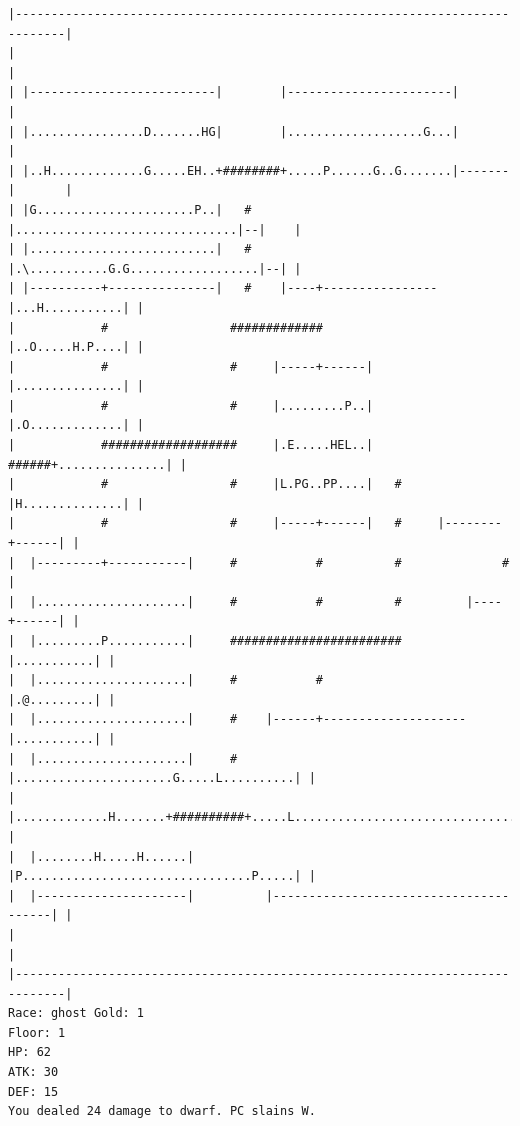 \documentclass[11pt]{article}
\theoremstyle{plain}
\begin{document}
\begin{Verbatim}[fontsize=\scriptsize]
|-----------------------------------------------------------------------------|
|                                                                             |
| |--------------------------|        |-----------------------|               |
| |................D.......HG|        |...................G...|               |
| |..H.............G.....EH..+########+.....P......G..G.......|-------|       |
| |G......................P..|   #    |...............................|--|    |
| |..........................|   #    |.\...........G.G..................|--| |
| |----------+---------------|   #    |----+----------------|...H...........| |
|            #                 #############                |..O.....H.P....| |
|            #                 #     |-----+------|         |...............| |
|            #                 #     |.........P..|         |.O.............| |
|            ###################     |.E.....HEL..|   ######+...............| |
|            #                 #     |L.PG..PP....|   #     |H..............| |
|            #                 #     |-----+------|   #     |--------+------| |
|  |---------+-----------|     #           #          #              #        |
|  |.....................|     #           #          #         |----+------| |
|  |.........P...........|     ########################         |...........| |
|  |.....................|     #           #                    |.@.........| |
|  |.....................|     #    |------+--------------------|...........| |
|  |.....................|     #    |......................G.....L..........| |
|  |.............H.......+##########+.....L.................................| |
|  |........H.....H......|          |P................................P.....| |
|  |---------------------|          |---------------------------------------| |
|                                                                             |
|-----------------------------------------------------------------------------|
Race: ghost Gold: 1                                                    Floor: 1
HP: 62
ATK: 30
DEF: 15
You dealed 24 damage to dwarf. PC slains W. 

\end{Verbatim}
\end{document}
